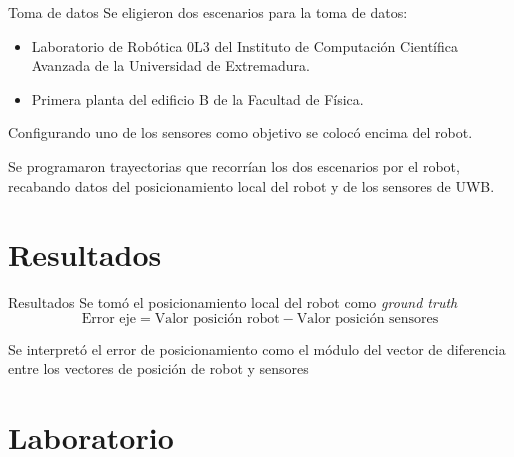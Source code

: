 \documentclass{beamer}
\begin{document}
  \begin{frame}{Toma de datos}
    Se eligieron dos escenarios para la toma de datos:
    \begin{itemize}
      \item Laboratorio de Robótica 0L3 del Instituto de Computación Científica Avanzada de la Universidad de Extremadura.
      \item Primera planta del edificio B de la Facultad de Física.
    \end{itemize}

    \vspace{0.5cm}
    Configurando uno de los sensores como objetivo se colocó encima del robot.

    \vspace{0.5cm}
    Se programaron trayectorias que recorrían los dos escenarios por el robot, recabando datos del posicionamiento local del robot y de los sensores de UWB.
  \end{frame}

\section{Resultados}
  \begin{frame}{Resultados}
    Se tomó el posicionamiento local del robot como \textit{ground truth}
    \begin{equation*}\label{eq:Diff_eje}
      \text{Error eje} = \text{Valor posición robot} - \text{Valor posición sensores}
    \end{equation*}

    Se interpretó el error de posicionamiento como el módulo del vector de diferencia entre los vectores de posición de robot y sensores
    \begin{figure}[H]
      \centering
      
    \end{figure}
  \end{frame}

\section{Laboratorio}
\end{document}
